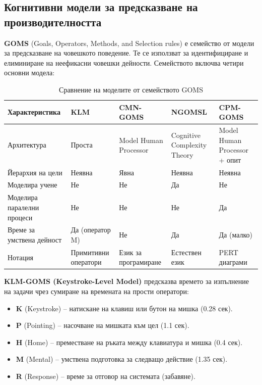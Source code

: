 \documentclass{scrartcl}
\begin{document}
\begin{FlushLeft}
\subsection{Когнитивни модели за предсказване на производителността}

\textbf{GOMS} (Goals, Operators, Methods, and Selection rules) е семейство от модели за предсказване на човешкото поведение. Те се използват за идентифициране и елиминиране на неефикасни човешки дейности. Семейството включва четири основни модела:

\begin{table}[H]
\centering
\caption{Сравнение на моделите от семейството GOMS}
\begin{tabular}{|p{2.2cm}|p{2cm}|p{2.2cm}|p{2.2cm}|p{2.2cm}|}
\hline
\textbf{Характеристика} & \textbf{KLM} & \textbf{CMN-GOMS} & \textbf{NGOMSL} & \textbf{CPM-GOMS} \\
\hline
Архитектура & Проста & Model Human Processor & Cognitive Complexity Theory & Model Human Processor + опит \\
\hline
Йерархия на цели & Неявна & Явна & Неявна & Неявна \\
\hline
Моделира учене & Не & Не & Да & Не \\
\hline
Моделира паралелни процеси & Не & Не & Не & Да \\
\hline
Време за умствена дейност & Да (оператор M) & Не & Да & Да (малко) \\
\hline
Нотация & Примитивни оператори & Език за програмиране & Естествен език & PERT диаграми \\
\hline
\end{tabular}
\end{table}

\textbf{KLM-GOMS (Keystroke-Level Model)} предсказва времето за изпълнение на задачи чрез сумиране на времената на прости оператори:
\begin{itemize}
    \item \textbf{K} (Keystroke) – натискане на клавиш или бутон на мишка (0.28 сек).
    \item \textbf{P} (Pointing) – насочване на мишката към цел (1.1 сек).
    \item \textbf{H} (Home) – преместване на ръката между клавиатура и мишка (0.4 сек).
    \item \textbf{M} (Mental) – умствена подготовка за следващо действие (1.35 сек).
    \item \textbf{R} (Response) – време за отговор на системата (забавяне).
\end{itemize}


\end{FlushLeft}
\end{document}

